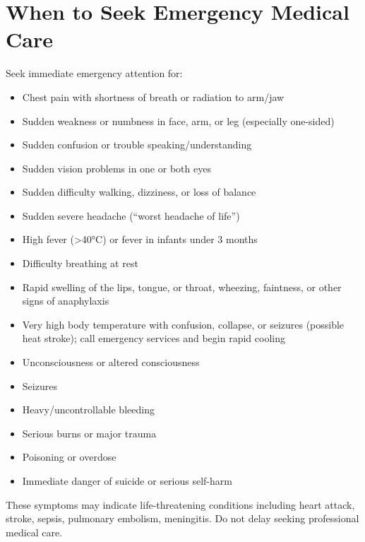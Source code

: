 \chapter{When to Seek Emergency Medical Care}

Seek immediate emergency attention for:

\begin{itemize}
  \item Chest pain with shortness of breath or radiation to arm/jaw
  \item Sudden weakness or numbness in face, arm, or leg (especially one-sided)
  \item Sudden confusion or trouble speaking/understanding
  \item Sudden vision problems in one or both eyes
  \item Sudden difficulty walking, dizziness, or loss of balance
  \item Sudden severe headache (``worst headache of life'')
  \item High fever (>40°C) or fever in infants under 3 months
  \item Difficulty breathing at rest
  \item Rapid swelling of the lips, tongue, or throat, wheezing, faintness, or other signs of anaphylaxis
  \item Very high body temperature with confusion, collapse, or seizures (possible heat stroke); call emergency services and begin rapid cooling
  \item Unconsciousness or altered consciousness
  \item Seizures
  \item Heavy/uncontrollable bleeding
  \item Serious burns or major trauma
  \item Poisoning or overdose
  \item Immediate danger of suicide or serious self-harm
\end{itemize}

These symptoms may indicate life-threatening conditions including heart attack, stroke, sepsis, pulmonary embolism, meningitis. Do not delay seeking professional medical care.

\clearpage
